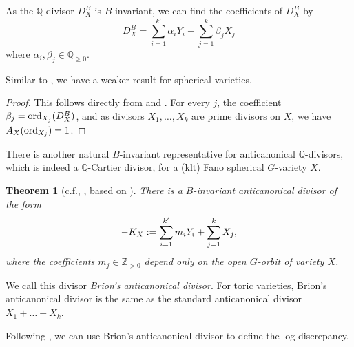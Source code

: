 \documentclass[11pt, oneside]{amsart}
\newtheorem{theorem}{Theorem}[section]
\newtheorem{corollary}[theorem]{Corollary}
\newcommand{\<}{\left\langle} \renewcommand{\>}{\right\rangle}
\let\oldsum\sum
\renewcommand{\sum}{\oldsum\limits}
\begin{document}
As the $\mathbb{Q}$-divisor $D^B_X$ is $B$-invariant, we can find the coefficients of $D^B_X$ by 
\begin{equation}
    D^B_X = \sum_{i = 1}^{k'} \alpha_i Y_i + \sum_{j = 1}^{k} \beta_j X_j
\end{equation}
where $\alpha_i, \beta_j \in \mathbb{Q}_{\geq 0}$.

Similar to , we have a weaker result for spherical varieties,
\begin{proof}
    This follows directly from  and . For every $j$, the coefficient $\beta_j = \mathrm{ord}_{X_j}(D^B_X)$, and as divisors $X_1, \dots, X_k$ are prime divisors on $X$, we have $A_X(\mathrm{ord}_{X_j}) = 1$.
\end{proof}

There is another natural $B$-invariant representative for anticanonical $\mathbb{Q}$-divisors, which is indeed a $\mathbb{Q}$-Cartier divisor, for a (klt) Fano spherical $G$-variety $X$.
\begin{theorem}[c.f., {\cite[Theorem 1.2]{GH_gor_sph_fano_var}}, based on {\cite[\S4.1, 4.2]{Brion_cur_div_sph_var}}]
    There is a $B$-invariant anticanonical divisor of the form
    \begin{equation*}
        -\cano_X := \sum_{i = 1}^{k'} m_i Y_i + \sum_{j = 1}^{k} X_j,
    \end{equation*}
    where the coefficients $m_j \in \mathbb{Z}_{> 0}$ depend only on the open $G$-orbit of variety $X$.
\end{theorem}
\begin{remark*}
    We call this divisor \emph{Brion's anticanonical divisor}. For toric varieties, Brion's anticanonical divisor is the same as the standard anticanonical divisor $X_1 + \dots + X_k$.
\end{remark*}

Following , we can use Brion's anticanonical divisor to define the log discrepancy.
\end{document}
